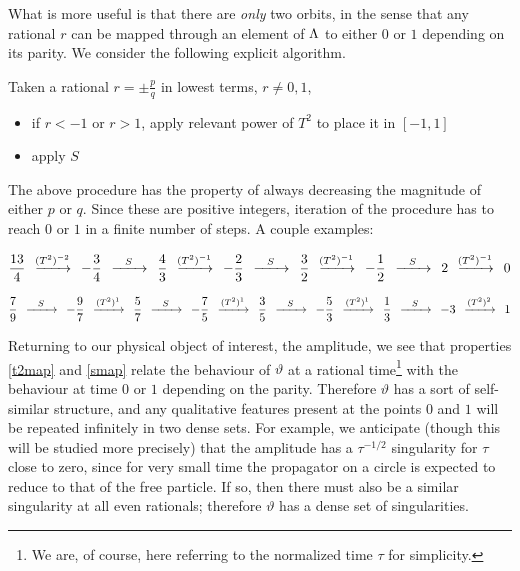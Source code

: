 \documentclass{article}
\newcommand{\T}{\ensuremath{\vartheta}}
\begin{document}
What is more useful is that there are \emph{only} two orbits, in the sense that any rational $r$ can be mapped through an element of $\Lambda$ to either $0$ or $1$ depending on its parity. We consider the following explicit algorithm.

Taken a rational $r = \pm \frac{p}{q}$ in lowest terms, $r\neq 0, 1$,

\begin{itemize}
    \item if $r < -1$ or $r > 1$, apply relevant power of $T^2$ to place it in $[-1,1]$
    \item apply $S$
\end{itemize}

The above procedure has the property of always decreasing the magnitude of either $p$ or $q$. Since these are positive integers, iteration of the procedure has to reach $0$ or $1$ in a finite number of steps. A couple examples:

\newcommand{\sapp}{\,\;\ensuremath{\xrightarrow{\mathmakebox[2em]{S}}}\;\,}
\newcommand{\tapp}[1]{\,\;\xrightarrow{\mathmakebox[2em]{(T^2)^{#1}}}\;\,}

\begin{equation}
    \frac{13}{4} \tapp{-2} - \frac{3}{4} \sapp \frac{4}{3} \tapp{-1} - \frac{2}{3} \sapp \frac{3}{2} \tapp{-1} -\frac{1}{2} \sapp 2 \tapp{-1} 0
\end{equation}

\begin{equation}
    \frac{7}{9} \sapp - \frac{9}{7} \tapp{1} \frac{5}{7} \sapp -\frac{7}{5} \tapp{1} \frac{3}{5} \sapp - \frac{5}{3} \tapp{1} \frac{1}{3} \sapp -3 \tapp{2} 1
\end{equation}

Returning to our physical object of interest, the amplitude, we see that properties \eqref{t2map} and \eqref{smap} relate the behaviour of $\T$ at a rational time\footnote{We are, of course, here referring to the normalized time $\tau$ for simplicity.} with the behaviour at time $0$ or $1$ depending on the parity. Therefore $\T$ has a sort of self-similar structure, and any qualitative features present at the points $0$ and $1$ will be repeated infinitely in two dense sets. For example, we anticipate (though this will be studied more precisely) that the amplitude has a $\tau^{-1/2}$ singularity for $\tau$ close to zero, since for very small time the propagator on a circle is expected to reduce to that of the free particle. If so, then there must also be a similar singularity at all even rationals; therefore $\T$ has a dense set of singularities.
\end{document}
